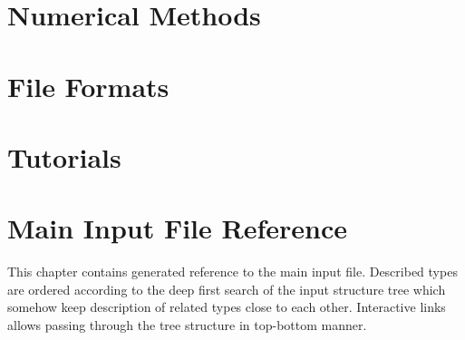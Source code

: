 \documentclass[12pt,a4paper]{report}
\begin{document}










\chapter{Numerical Methods}
\label{chapter:numerical}






%


\chapter{File Formats}
\label{chapter:file-formats}





% 
%   

%  
% 
%  

\chapter{Tutorials}\label{chapter:tutorials}


\chapter{Main Input File Reference}
\label{chapter:input-tree-reference}
This chapter contains generated reference to the main input file. Described types are ordered according to the 
deep first search of the input structure tree which somehow keep description of related types close to each other.
Interactive links allows passing through the tree structure in top-bottom manner. 
\end{document}
